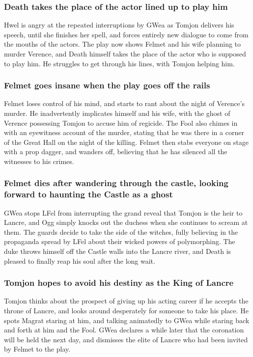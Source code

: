 \subsubsection{\Gls{Death} takes the place of the actor lined up to play him}
\Gls{Hwel} is angry at the repeated interruptions by \Gls{GWea} as \Gls{Tomjon} delivers his speech,
until she finishes her spell, and forces entirely new dialogue to come from the mouths of the
actors. The play now shows \Gls{Felmet} and his wife planning to murder \Gls{Verence}, and
\Gls{Death} himself takes the place of the actor who is supposed to play him. He struggles to get
through his lines, with \Gls{Tomjon} helping him.

\subsubsection{\Gls{Felmet} goes insane when the play goes off the rails}
\Gls{Felmet} loses control of his mind, and starts to rant about the night of \Gls{Verence}'s
murder. He inadvertently implicates himself and his wife, with the ghost of \Gls{Verence} possessing
\Gls{Tomjon} to accuse him of regicide. The \Gls{Fool} also chimes in with an eyewitness account of
the murder, stating that he was there in a corner of the Great Hall on the night of the killing.
\Gls{Felmet} then stabs everyone on stage with a prop dagger, and wanders off, believing that he
has silenced all the witnesses to his crimes.

\subsubsection{\Gls{Felmet} dies after wandering through the castle, looking forward to haunting
    the Castle as a ghost}
\Gls{GWea} stops \Gls{LFel} from interrupting the grand reveal that \Gls{Tomjon} is the heir to
Lancre, and \Gls{Ogg} simply knocks out the duchess when she continues to scream at them. The guards
decide to take the side of the witches, fully believing in the propaganda spread by \Gls{LFel} about
their wicked powers of polymorphing. The duke throws himself off the Castle walls into the
Lancre river, and \Gls{Death} is pleased to finally reap his soul after the long wait.

\subsubsection{\Gls{Tomjon} hopes to avoid his destiny as the King of Lancre}
\Gls{Tomjon} thinks about the prospect of giving up his acting career if he accepts the throne of
Lancre, and looks around desperately for someone to take his place. He spots \Gls{Magrat} staring
at him, and talking animatedly to \Gls{GWea} while staring back and forth at him and the \Gls{Fool}.
\Gls{GWea} declares a while later that the coronation will be held the next day, and dismisses the
elite of Lancre who had been invited by \Gls{Felmet} to the play.

